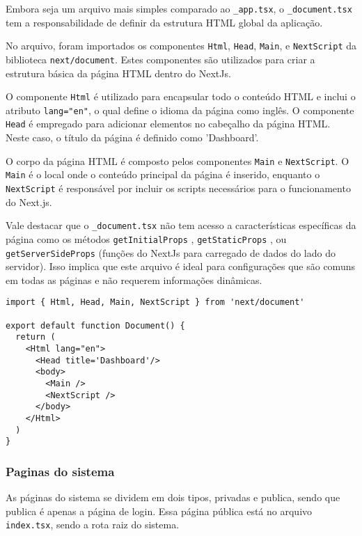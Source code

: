 Embora seja um arquivo mais simples comparado ao \texttt{\_app.tsx}, o \texttt{\_document.tsx} tem a responsabilidade de definir da estrutura HTML global da aplicação.

No arquivo, foram importados os componentes \texttt{Html}, \texttt{Head}, \texttt{Main}, e \texttt{NextScript} da biblioteca \texttt{next/document}. Estes componentes são utilizados para criar a estrutura básica da página HTML dentro do NextJs.

O componente \texttt{Html} é utilizado para encapsular todo o conteúdo HTML e inclui o atributo \texttt{lang="en"}, o qual define o idioma da página como inglês. O componente \texttt{Head} \cite{nextjsHeadComponent} é empregado para adicionar elementos no cabeçalho da página HTML. Neste caso, o título da página é definido como 'Dashboard'.

O corpo da página HTML é composto pelos componentes \texttt{Main} e \texttt{NextScript}. O \texttt{Main} é o local onde o conteúdo principal da página é inserido, enquanto o \texttt{NextScript} é responsável por incluir os scripts necessários para o funcionamento do Next.js.

Vale destacar que o \texttt{\_document.tsx} não tem acesso a características específicas da página como os métodos \texttt{getInitialProps} \cite{nextjsInitialProps}, \texttt{getStaticProps} \cite{nextjsGetStaticProps}, ou \texttt{getServerSideProps} \cite{nextjsGetServerSideProps} (funções do NextJs para carregado de dados do lado do servidor). Isso implica que este arquivo é ideal para configurações que são comuns em todas as páginas e não requerem informações dinâmicas.

\begin{verbatim}
import { Html, Head, Main, NextScript } from 'next/document'

export default function Document() {
  return (
    <Html lang="en">
      <Head title='Dashboard'/>
      <body>
        <Main />
        <NextScript />
      </body>
    </Html>
  )
}
\end{verbatim}

\subsubsection{Paginas do sistema}\label{subsec:}
As páginas do sistema se dividem em dois tipos, privadas e publica, sendo que publica é apenas a página de login. Essa página pública está no arquivo \texttt{index.tsx}, sendo a rota raiz do sistema. 

